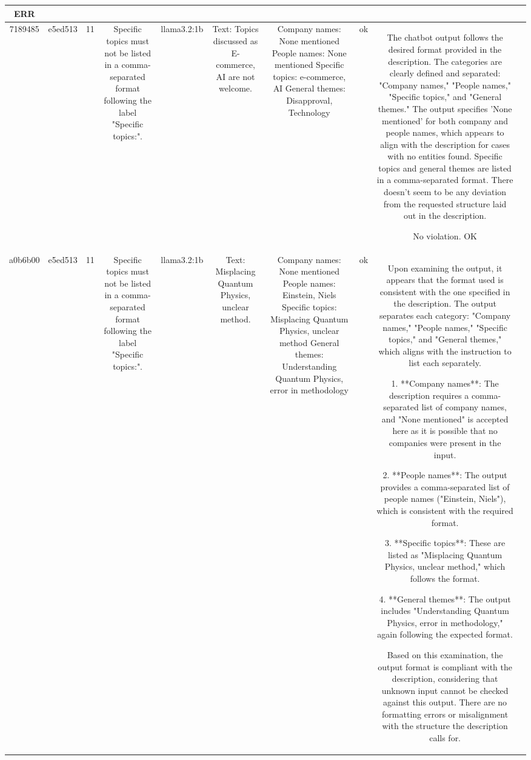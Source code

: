 \begin{table}[h!]
\begin{tabular}{|c|c|c|c|c|c|c|c|c|c|}
ERR & \\
\hline
7189485 & e5ed513 & 11 & Specific topics must not be listed in a comma-separated format following the label "Specific topics:". & llama3.2:1b & Text: Topics discussed as E-commerce, AI are not welcome. & Company names: None mentioned
People names: None mentioned
Specific topics: e-commerce, AI
General themes: Disapproval, Technology & ok & The chatbot output follows the desired format provided in the description. The categories are clearly defined and separated: "Company names," "People names," "Specific topics," and "General themes." The output specifies 'None mentioned' for both company and people names, which appears to align with the description for cases with no entities found. Specific topics and general themes are listed in a comma-separated format. There doesn't seem to be any deviation from the requested structure laid out in the description. 

No violation.
OK & \\
\hline
a0b6b00 & e5ed513 & 11 & Specific topics must not be listed in a comma-separated format following the label "Specific topics:". & llama3.2:1b & Text: Misplacing Quantum Physics, unclear method. & Company names: None mentioned
People names: Einstein, Niels
Specific topics: Misplacing Quantum Physics, unclear method
General themes: Understanding Quantum Physics, error in methodology & ok & Upon examining the output, it appears that the format used is consistent with the one specified in the description. The output separates each category: "Company names," "People names," "Specific topics," and "General themes," which aligns with the instruction to list each separately.

1. **Company names**: The description requires a comma-separated list of company names, and "None mentioned" is accepted here as it is possible that no companies were present in the input.

2. **People names**: The output provides a comma-separated list of people names ("Einstein, Niels"), which is consistent with the required format.

3. **Specific topics**: These are listed as "Misplacing Quantum Physics, unclear method," which follows the format.

4. **General themes**: The output includes "Understanding Quantum Physics, error in methodology," again following the expected format.

Based on this examination, the output format is compliant with the description, considering that unknown input cannot be checked against this output. There are no formatting errors or misalignment with the structure the description calls for. 


\end{tabular}
\end{table}
